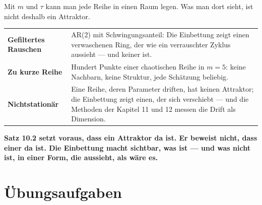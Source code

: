 \begin{warnung}
Mit $m$ und $\tau$ kann man jede Reihe in einen Raum legen. Was man dort sieht, ist nicht deshalb ein Attraktor.

\begin{center}
{\small
\renewcommand{\arraystretch}{1.5}
\begin{tabular}{@{}P{3.0cm}P{5.8cm}@{}}
\toprule
\textbf{Gefiltertes Rauschen} & AR(2) mit Schwingungsanteil: Die Einbettung zeigt einen verwaschenen Ring, der wie ein verrauschter Zyklus aussieht --- und keiner ist.\\
\textbf{Zu kurze Reihe} & Hundert Punkte einer chaotischen Reihe in $m = 5$: keine Nachbarn, keine Struktur, jede Schätzung beliebig.\\
\textbf{Nichtstationär} & Eine Reihe, deren Parameter driften, hat keinen Attraktor; die Einbettung zeigt einen, der sich verschiebt --- und die Methoden der Kapitel 11 und 12 messen die Drift als Dimension.\\
\bottomrule
\end{tabular}}
\end{center}

\begin{center}
\begin{minipage}{0.9\textwidth}
\textbf{Satz 10.2 setzt voraus, dass ein Attraktor da ist. Er beweist nicht, dass einer da ist. Die Einbettung macht sichtbar, was ist --- und was nicht ist, in einer Form, die aussieht, als wäre es.}
\end{minipage}
\end{center}

\begin{center}
\begin{minipage}{0.88\textwidth}
\end{minipage}
\end{center}
\end{warnung}

\section{Übungsaufgaben}


